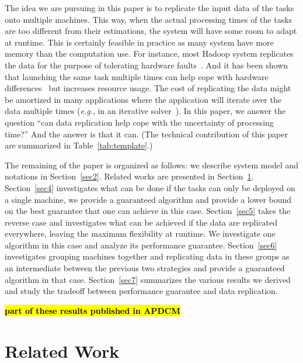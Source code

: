 \documentclass[twocolumn]{svjour3}
\newcommand{\todo}[1]{{\color{red}\textbf{\hl{#1}}\xspace}}
\begin{document}
The idea we are pursuing in this paper is to replicate the input data
of the tasks onto multiple machines. This way, when the actual
processing times of the tasks are too different from their
estimations, the system will have some room to adapt at runtime. This
is certainly feasible in practice as many system have more memory than
the computation use. For instance, most Hadoop system replicates the
data for the purpose of tolerating hardware
faults~\cite{White:2009:HDG:1717298}. And it has been shown that
launching the same task multiple times can help cope with hardware
differences~\cite{DBLP:journals/corr/WangJW14} but increases resource
usage. The cost of replicating the data might be amortized in many
applications where the application will iterate over the data
multiple times ({\em e.g.}, in an iterative solver~\cite{Zhou12-P2S2,Zhou12-Cluster}). In this paper, we
answer the question ``can data replication help cope with the
uncertainty of processing time?''  And the answer is that it can. (The technical contribution of this paper are summarized in Table~\ref{tab:template}.)

The remaining of the paper is organized as follows: we describe system
model and notations in Section~\ref{sec2}. Related works are presented
in Section~\ref{sec3}.  Section~\ref{sec4} investigates what can be
done if the tasks can only be deployed on a single machine, we
provide a guaranteed algorithm and provide a lower bound on the best
guarantee that one can achieve in this case. Section~\ref{sec5} takes
the reverse case and investigates what can be achieved if the data are
replicated everywhere, leaving the maximum flexibility at runtime. We
investigate one algorithm in this case and analyze its performance
guarantee. Section~\ref{sec6} investigates grouping machines
together and replicating data in these groups as an intermediate
between the previous two strategies and provide a guaranteed algorithm
in that case. Section~\ref{sec7} summarizes the various results we
derived and study the tradeoff between performance guarantee and data
replication.

\todo{part of these results published in APDCM}

\section{Related Work}\label{sec3}
\end{document}
